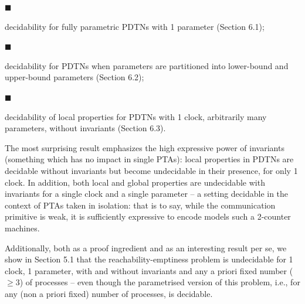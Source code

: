 \documentclass[10pt,a4paper]{article}
\begin{document}
 
\par\noindent  $\blacksquare$ 
 
decidability for fully parametric PDTNs with 1 parameter (Section 6.1);\par
 
 
 
\par\noindent  $\blacksquare$ 
 
decidability for PDTNs when parameters are partitioned into lower-bound and upper-bound parameters (Section 6.2);\par
 
 
 
\par\noindent  $\blacksquare$ 
 
decidability of local properties for PDTNs with 1 clock, arbitrarily many parameters, without invariants (Section 6.3).\par
 
 
  
The most surprising result emphasizes the high expressive power of invariants (something which has no impact in single PTAs): local properties in PDTNs are decidable without invariants but become undecidable in their presence, for only 1 clock. In addition, both local and global properties are undecidable with invariants for a single clock and a single parameter -- a setting decidable in the context of PTAs taken in isolation: that is to say, while the communication primitive is weak, it is sufficiently expressive to encode models such a 2-counter machines.\par
 
 
 
Additionally, both as a proof ingredient and as an interesting result per se, we show in Section 5.1 that the reachability-emptiness problem is undecidable for 1 clock, 1 parameter, with and without invariants and any a priori fixed number ($\geq 3$) of processes -- even though the parametrised version of this problem, i.e., for any (non a priori fixed) number of processes, is decidable.\par
 
 
 
 
\end{document}
